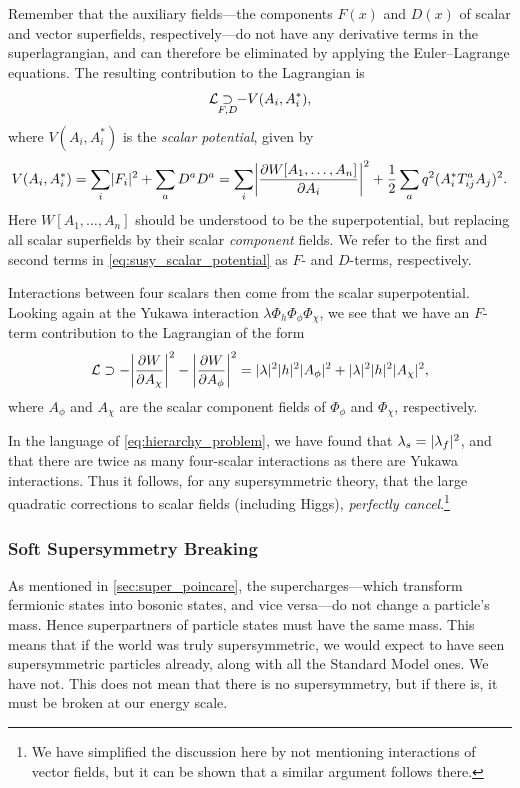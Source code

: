 Remember that the auxiliary fields---the components $F(x)$ and $D(x)$ of scalar and vector superfields, respectively---do not have any derivative terms in the superlagrangian, and can therefore be eliminated by applying the Euler--Lagrange equations.
The resulting contribution to the Lagrangian is
\begin{equation}
    \mathcal{L} \underset{\mathclap{F,D}}{\supset} -V(A_i,A_i^*),
\end{equation}
where $V(A_i,A_i^*)$ is the \emph{scalar potential}, given by~\cite{Martin:1997ns}
\begin{equation}\label{eq:susy_scalar_potential}
    V(A_i,A_i^*) = \sum_i \lvert F_i\rvert^2 + \sum_a D^a D^a
    = \sum_i\biggl\lvert\frac{\partial W[A_1,\ldots,A_n]}{\partial A_i}\biggr\rvert^2
    + \frac{1}{2}\sum_a q^2 (A_i^* T^a_{ij} A_j)^2.
\end{equation}
Here $W[A_1,\ldots,A_n]$ should be understood to be the superpotential, but replacing all scalar superfields by their scalar \emph{component} fields.
We refer to the first and second terms in \cref{eq:susy_scalar_potential} as $F$- and $D$-terms, respectively.

Interactions between four scalars then come from the scalar superpotential.
Looking again at the Yukawa interaction $\lambda\Phi_h \Phi_\phi\Phi_\chi$, we see that we have an $F$-term contribution to the Lagrangian of the form
\begin{equation}
    \mathcal{L} \supset
    - \biggl\lvert\frac{\partial W}{\partial A_\chi}\biggr\rvert^2
    - \biggl\lvert\frac{\partial W}{\partial A_\phi}\biggr\rvert^2
    = \lvert\lambda\rvert^2 \lvert h\rvert^2 \lvert A_\phi\rvert^2 + \lvert\lambda\rvert^2 \lvert h\rvert^2 \lvert A_\chi\rvert^2,
\end{equation}
where $A_\phi$ and $A_\chi$ are the scalar component fields of $\Phi_\phi$ and $\Phi_\chi$, respectively.

In the language of \cref{eq:hierarchy_problem}, we have found that $\lambda_s = \lvert\lambda_f\rvert^2$, and that there are twice as many four-scalar interactions as there are Yukawa interactions. Thus it follows, for any supersymmetric theory, that the large quadratic corrections to scalar fields (including Higgs), \emph{perfectly cancel}.\footnote{We have simplified the discussion here by not mentioning interactions of vector fields, but it can be shown that a similar argument follows there.}




\subsubsection{Soft Supersymmetry Breaking}
As mentioned in \cref{sec:super_poincare}, the supercharges---which transform fermionic states into bosonic states, and vice versa---do not change a particle's mass.
Hence superpartners of particle states must have the same mass.
This means that if the world was truly supersymmetric, we would expect to have seen supersymmetric particles already, along with all the Standard Model ones. We have not.
This does not mean that there is no supersymmetry, but if there is, it must be broken at our energy scale.


